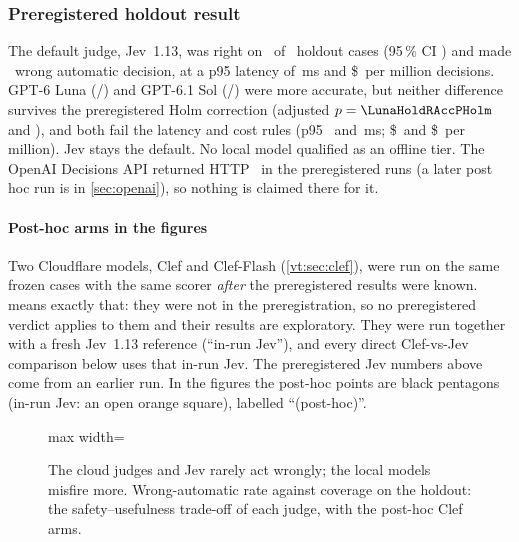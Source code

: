 \subsubsection{Preregistered holdout result \texorpdfstring{\prereg}{[preregistered]}}



The default judge, Jev~1.13, was right on \JevHoldAccK\ of \HoldN\ holdout cases (95\,\% CI \JevHoldAccCI) and
made \JevHoldWaK\ wrong automatic decision, at a p95 latency of \JevHoldPninetyfive\,ms and \$\JevHoldCost\ per
million decisions. GPT-6 Luna (\LunaHoldAccK/\HoldN) and GPT-6.1 Sol (\SolHoldAccK/\HoldN) were more accurate,
but neither difference survives the preregistered Holm correction (adjusted $p = \LunaHoldRAccPHolm$ and
\SolHoldRAccPHolm), and both fail the latency and cost rules (p95 \LunaHoldPninetyfive\ and
\SolHoldPninetyfive\,ms; \$\LunaHoldCost\ and \$\SolHoldCost\ per million). Jev stays the default. No local model
qualified as an offline tier. The OpenAI Decisions API returned HTTP \HoldProbeStatus\ in the preregistered runs (a later post hoc run is in \cref{sec:openai}), so nothing is claimed there
for it.

\paragraph{Post-hoc arms in the figures} Two Cloudflare models, Clef and Clef-Flash (\cref{vt:sec:clef}), were run on
the same frozen cases with the same scorer \emph{after} the preregistered results were known.  means
exactly that: they were not in the preregistration, so no preregistered verdict applies to them and their results
are exploratory. They were run together with a fresh Jev~1.13 reference (``in-run Jev''), and every direct Clef-vs-Jev
comparison below uses that in-run Jev. The preregistered Jev numbers above come from an earlier run. In the figures
the post-hoc points are black pentagons (in-run Jev: an open orange square), labelled ``(post-hoc)''.



\begin{figure}[tbp]
\centering

\begin{adjustbox}{max width=\linewidth}\end{adjustbox}
\caption{The cloud judges and Jev rarely act wrongly; the local models misfire more. Wrong-automatic rate against coverage on the holdout: the safety--usefulness trade-off of each judge,
with the post-hoc Clef arms.}
\label{vt:fig:jbwacov}
\end{figure}

